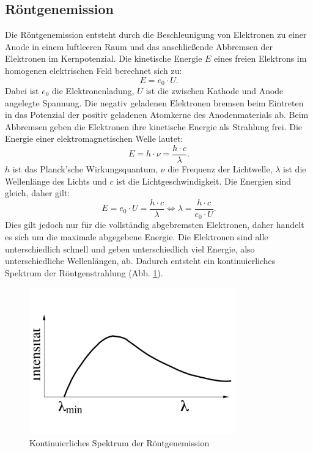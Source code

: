 \subsection{Röntgenemission}
Die Röntgenemission entsteht durch die Beschleunigung von Elektronen zu einer Anode in einem luftleeren Raum und das anschließende Abbremsen der Elektronen im Kernpotenzial.
Die kinetische Energie $E$ eines freien Elektrons im homogenen elektrischen Feld berechnet sich zu:
\begin{equation*}
  E=e_{0} \cdot U.
\end{equation*}
Dabei ist $e_{0}$ die Elektronenladung, $U$ ist die zwischen Kathode und Anode angelegte Spannung.
Die negativ geladenen Elektronen bremsen beim Eintreten in das Potenzial der positiv geladenen Atomkerne des Anodenmaterials ab.
Beim Abbremsen geben die Elektronen ihre kinetische Energie als Strahlung frei.
Die Energie einer elektromagnetischen Welle lautet:
\begin{equation}
  E=h \cdot \nu = \frac{h\cdot c}{\lambda}.
  \label{eqn:lambda}
\end{equation}
$h$ ist das Planck'sche Wirkungsquantum, $\nu$ die Frequenz der Lichtwelle, $\lambda$ ist die Wellenlänge des Lichts und $c$ ist die Lichtgeschwindigkeit.
Die Energien sind gleich, daher gilt:
\begin{equation}
  E=e_{0} \cdot U= \frac{h\cdot c}{\lambda} \Leftrightarrow \lambda=  \frac{h\cdot c}{e_{0} \cdot U}.
\label{eqn:lambdamin}
\end{equation}
Dies gilt jedoch nur für die vollständig abgebremsten Elektronen, daher handelt es sich um die maximale abgegebene Energie.
Die Elektronen sind alle unterschiedlich schnell und geben unterschiedlich viel Energie, also unterschiedliche Wellenlängen, ab.
Dadurch entsteht ein kontinuierliches Spektrum der Röntgenstrahlung (Abb. \ref{fig:kontinuierlich}).
\begin{figure}[h!]
  \centering
  \includegraphics[width=0.8\textwidth]{kontinuierlich.pdf}
  \caption{Kontinuierliches Spektrum der Röntgenemission \cite{1}}
  \label{fig:kontinuierlich}
\end{figure}

